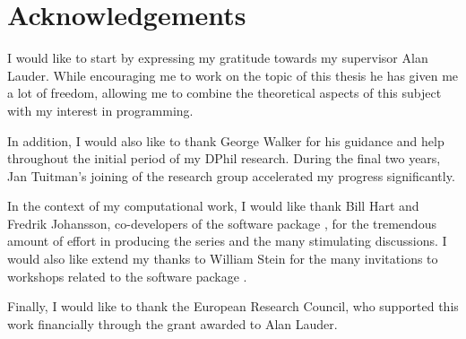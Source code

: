 \chapter*{Acknowledgements}

I would like to start by expressing my gratitude towards 
my supervisor Alan Lauder.  While encouraging me to work 
on the topic of this thesis he has given me a lot of freedom, 
allowing me to combine the theoretical aspects of this subject 
with my interest in programming.

In addition, I would also like to thank George Walker for his 
guidance and help throughout the initial period of my DPhil 
research.  During the final two years, Jan Tuitman's joining 
of the research group accelerated my progress significantly.

In the context of my computational work, I would like thank 
Bill Hart and Fredrik Johansson, co-developers of the software 
package {}, for the tremendous amount of effort in 
producing the {} series and the many stimulating 
discussions.  I would also like extend my thanks to William Stein 
for the many invitations to workshops related to the software package 
{}.

Finally, I would like to thank the European Research Council, 
who supported this work financially through the grant awarded 
to Alan Lauder.


